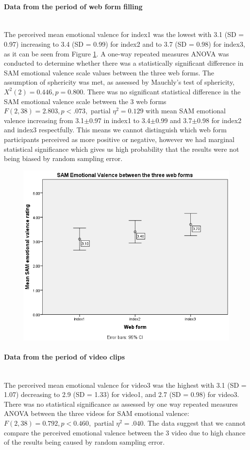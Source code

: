 \documentclass[a4paper]{report}
\begin{document}
			\paragraph{Data from the period of web form filling}\leavevmode\\
				The perceived mean emotional valence for index1 was the lowest with 
				3.1 (SD = 0.97) increasing to 3.4 (SD = 0.99) for index2 and to 3.7 (SD = 0.98) for index3, as it can be seen from Figure \ref{fig:sam-valence-index123}.
				A one-way repeated measures ANOVA was conducted to determine whether there was a statistically significant difference in SAM emotional valence scale values between the three web forms. The assumption of sphericity was met, as assessed by Mauchly's test of sphericity, $X^{2}(2) = 0.446, p = 0.800$. There was no significant statistical difference in the SAM emotional valence scale between the 3 web forms  $F(2,38)=2.803, p<.073,$ partial $\eta^{2}=0.129$ with mean SAM emotional valence increasing from 3.1$\pm$0.97 in index1 to 3.4$\pm$0.99 and 3.7$\pm$0.98 for index2 and index3 respectfully. This means we cannot distinguish which web form participants perceived as more positive or negative, however we had marginal statistical significance which gives us high probability that the results were not being biased by random sampling error.	
				\begin{figure}[h]
					\centering
					\includegraphics[width=0.7\linewidth]{sam-valence-index123}
					\caption{}
					\label{fig:sam-valence-index123}
				\end{figure}
			\paragraph{Data from the period of video clips}\leavevmode\\
				The perceived mean emotional valence for video3 was the highest with 3.1 (SD = 1.07) decreasing to 2.9 (SD = 1.33) for video1, and 2.7 (SD = 0.98) for video3. There was no statistical significance as assessed by one way repeated measures ANOVA between the three videos for SAM emotional valence: $F(2,38)=0.792, p<0.460,$ partial $\eta^{2}=.040$. The data suggest that we cannot compare the perceived emotional valence between the 3 video due to high chance of the results being caused by random sampling error.
\end{document}
